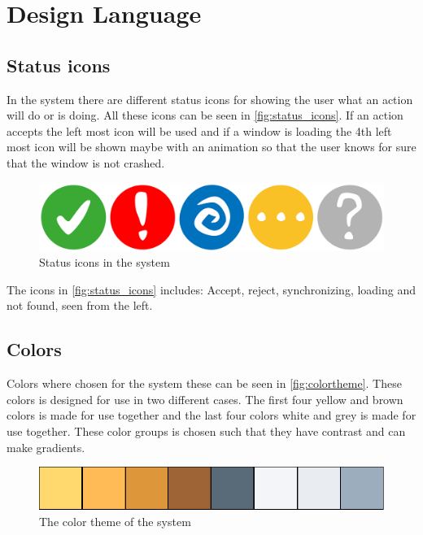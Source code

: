 \section{Design Language}
\label{design:design_language}

\subsection{Status icons}
\label{design:state_icons}

In the \giraf[] system there are different status icons for showing the user what an action will do or is doing. All these icons can be seen in \autoref{fig:status_icons}. If an action accepts the left most icon will be used and if a window is loading the 4th left most icon will be shown maybe with an animation so that the user knows for sure that the window is not crashed.

\begin{figure}[h!]
	\centering
	\includegraphics[width=\textwidth]{gfx/status_icons}
	\caption{Status icons in the \giraf[] system}
	\label{fig:status_icons}
\end{figure}

The icons in \autoref{fig:status_icons} includes: Accept, reject, synchronizing, loading and not found, seen from the left.

\subsection{Colors}
\label{design:giraf_colors}

Colors where chosen for the \giraf[] system these can be seen in \autoref{fig:colortheme}. These colors is designed for use in two different cases. The first four yellow and brown colors is made for use together and the last four colors white and grey is made for use together. These color groups is chosen such that they have contrast and can make gradients.

\begin{figure}[h!]
	\centering
	\includegraphics[width=\textwidth]{gfx/design_color_theme}
	\caption{The color theme of the \giraf[] system}
	\label{fig:colortheme}
\end{figure}

